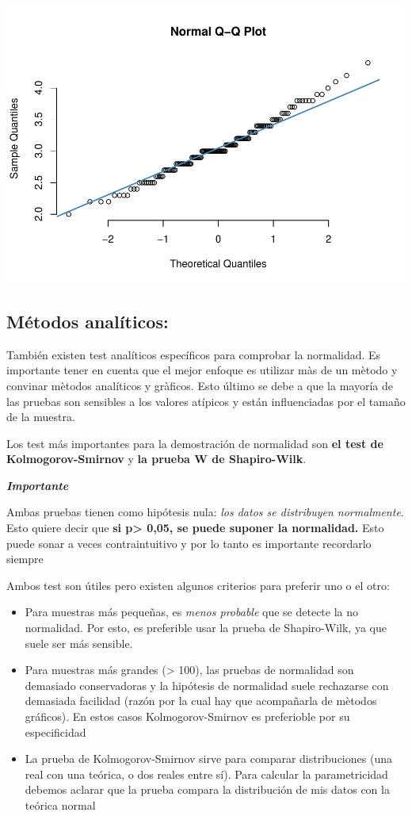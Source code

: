 \documentclass[
]{book}
\begin{document}
\includegraphics{Esatadistica_en_R_files/figure-latex/unnamed-chunk-127-1.pdf}

\hypertarget{muxe9todos-analuxedticos}{%
\subsection{Métodos analíticos:}\label{muxe9todos-analuxedticos}}

También existen test analíticos específicos para comprobar la normalidad. Es importante tener en cuenta que el mejor enfoque es utilizar màs de un mètodo y convinar mètodos analíticos y gràficos. Esto último se debe a que la mayoría de las pruebas son sensibles a los valores atípicos y están influenciadas por el tamaño de la muestra.

Los test más importantes para la demostración de normalidad son \textbf{el test de Kolmogorov-Smirnov} y \textbf{la prueba W de Shapiro-Wilk}.

\textbf{\emph{Importante}}

Ambas pruebas tienen como hipótesis nula: \emph{los datos se distribuyen normalmente}. Esto quiere decir que \textbf{si p\textgreater{} 0,05, se puede suponer la normalidad.}
Esto puede sonar a veces contraintuitivo y por lo tanto es importante recordarlo siempre

Ambos test son útiles pero existen algunos criterios para preferir uno o el otro:

\begin{itemize}
\item
  Para muestras más pequeñas, es \emph{menos probable} que se detecte la no normalidad. Por esto, es preferible usar la prueba de Shapiro-Wilk, ya que suele ser más sensible.
\item
  Para muestras más grandes (\textgreater{} 100), las pruebas de normalidad son demasiado conservadoras y la hipótesis de normalidad suele rechazarse con demasiada facilidad (razón por la cual hay que acompañarla de mètodos gráficos). En estos casos Kolmogorov-Smirnov es preferioble por su especificidad
\item
  La prueba de Kolmogorov-Smirnov sirve para comparar distribuciones (una real con una teórica, o dos reales entre sí). Para calcular la parametricidad debemos aclarar que la prueba compara la distribución de mis datos con la teórica normal
\end{itemize}
\end{document}
